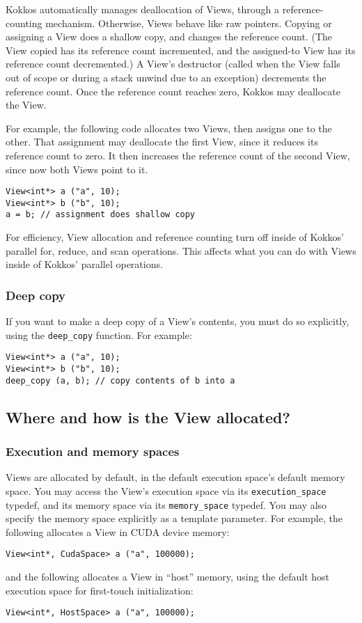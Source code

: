 Kokkos automatically manages deallocation of Views, through a
reference-counting mechanism.  Otherwise, Views behave like raw
pointers.  Copying or assigning a View does a shallow copy, and
changes the reference count.  (The View copied has its reference count
incremented, and the assigned-to View has its reference count
decremented.)  A View's destructor (called when the View falls out of
scope or during a stack unwind due to an exception) decrements the
reference count.  Once the reference count reaches zero, Kokkos may
deallocate the View.

For example, the following code allocates two Views, then assigns one
to the other.  That assignment may deallocate the first View, since it
reduces its reference count to zero.  It then increases the reference
count of the second View, since now both Views point to it.
\begin{lstlisting}
View<int*> a ("a", 10);
View<int*> b ("b", 10);
a = b; // assignment does shallow copy
\end{lstlisting}

For efficiency, View allocation and reference counting turn off inside
of Kokkos' parallel for, reduce, and scan operations.  This affects
what you can do with Views inside of Kokkos' parallel operations.

\subsubsection{Deep copy}

If you want to make a deep copy of a View's contents, you must do so
explicitly, using the \lstinline!deep_copy! function.  For example:
\begin{lstlisting}
View<int*> a ("a", 10);
View<int*> b ("b", 10);
deep_copy (a, b); // copy contents of b into a
\end{lstlisting}

\subsection{Where and how is the View allocated?}

\subsubsection{Execution and memory spaces}

Views are allocated by default, in the default execution space's
default memory space.  You may access the View's execution space via
its \lstinline!execution_space! typedef, and its memory space via its
\lstinline!memory_space! typedef.  You may also specify the memory space
explicitly as a template parameter.  For example, the following
allocates a View in CUDA device memory:
\begin{lstlisting}
View<int*, CudaSpace> a ("a", 100000);
\end{lstlisting}
and the following allocates a View in ``host'' memory, using the default 
host execution space for first-touch initialization:
\begin{lstlisting}
View<int*, HostSpace> a ("a", 100000);
\end{lstlisting}

